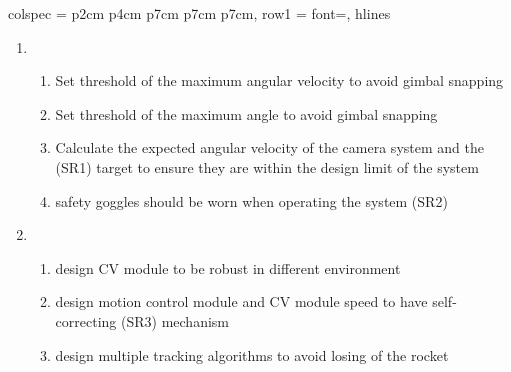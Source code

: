 \documentclass{article}
\begin{document}
\begin{table}[htbp]
{\begin{tblr}{
    colspec = {p{2cm} p{4cm} p{7cm} p{7cm} p{7cm}},
    row{1} = {font=\bfseries},
    hlines
  }
\begin{enumerate}
\begin{enumerate}
            \item Integration test before launch to ensure proper communication between 
            all modules
        \end{enumerate}
        \item \begin{enumerate}
            \item Set threshold of the maximum angular velocity to avoid gimbal snapping 
            \item Set threshold of the maximum angle to avoid gimbal snapping
            \item Calculate the expected angular velocity of the camera system and the (SR1)
            target to ensure
            they are within the design limit of the system
            \item safety goggles should be worn when operating the system (SR2)
        \end{enumerate}
        \item \begin{enumerate}
            \item design CV module to be robust in different environment 
            \item design motion control module and CV module speed to have self-correcting (SR3)
            mechanism
            \item design multiple tracking algorithms to avoid losing of the rocket


\end{enumerate}
\end{enumerate}
\end{tblr}}
\end{table}
\end{document}
